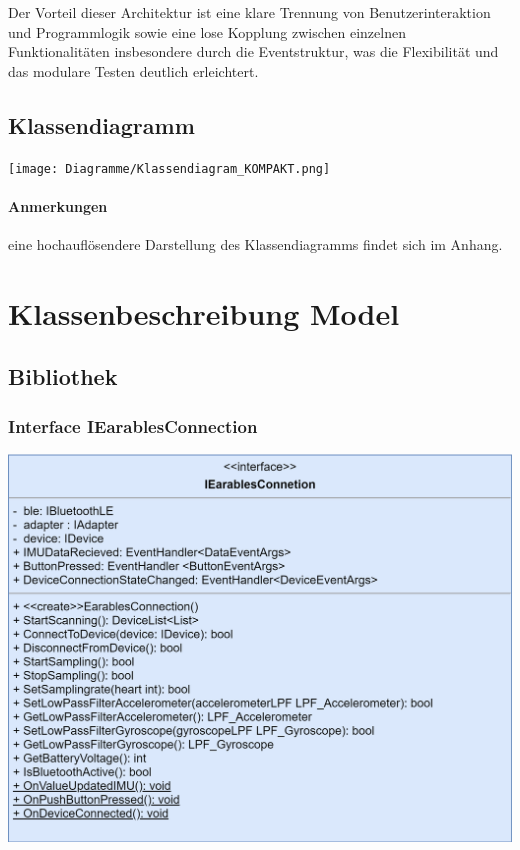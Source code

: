 \documentclass[a4paper,12pt]{article}
\begin{document}
  Der Vorteil dieser Architektur ist eine klare Trennung von Benutzerinteraktion und Programmlogik sowie eine lose Kopplung zwischen einzelnen Funktionalitäten insbesondere durch die Eventstruktur, was die Flexibilität und das modulare Testen deutlich erleichtert.
\clearpage
  \subsection{Klassendiagramm}
  \begin{center}
	\texttt{[image: Diagramme/Klassendiagram\_KOMPAKT.png]}
\end{center}
\paragraph{Anmerkungen}
eine hochauflösendere Darstellung des Klassendiagramms findet sich im Anhang.
\clearpage
\section{Klassenbeschreibung Model}
\subsection{Bibliothek}

	\subsubsection{Interface IEarablesConnection}
	
	\includegraphics[width=\textwidth]{bilder/BibPackageKlassen/IEarablesConnection.png}
\end{document}

